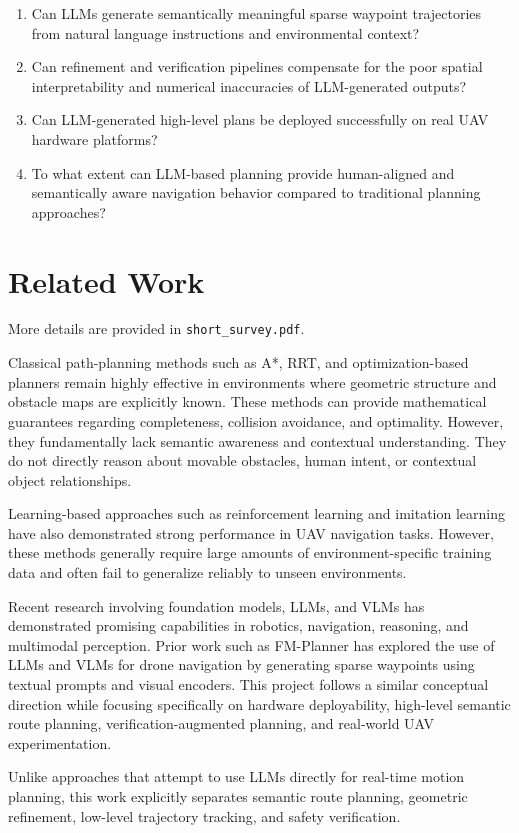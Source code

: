 \documentclass[11pt]{article}
\begin{document}
\begin{enumerate}
  \item Can LLMs generate semantically meaningful sparse waypoint trajectories from natural language instructions and environmental context?
  \item Can refinement and verification pipelines compensate for the poor spatial interpretability and numerical inaccuracies of LLM-generated outputs?
  \item Can LLM-generated high-level plans be deployed successfully on real UAV hardware platforms?
  \item To what extent can LLM-based planning provide human-aligned and semantically aware navigation behavior compared to traditional planning approaches?
\end{enumerate}

\section{Related Work}
More details are provided in \texttt{short\_survey.pdf}.

Classical path-planning methods such as A*, RRT, and optimization-based planners remain highly effective in environments where geometric structure and obstacle maps are explicitly known. These methods can provide mathematical guarantees regarding completeness, collision avoidance, and optimality. However, they fundamentally lack semantic awareness and contextual understanding. They do not directly reason about movable obstacles, human intent, or contextual object relationships.

Learning-based approaches such as reinforcement learning and imitation learning have also demonstrated strong performance in UAV navigation tasks. However, these methods generally require large amounts of environment-specific training data and often fail to generalize reliably to unseen environments.

Recent research involving foundation models, LLMs, and VLMs has demonstrated promising capabilities in robotics, navigation, reasoning, and multimodal perception. Prior work such as FM-Planner has explored the use of LLMs and VLMs for drone navigation by generating sparse waypoints using textual prompts and visual encoders. This project follows a similar conceptual direction while focusing specifically on hardware deployability, high-level semantic route planning, verification-augmented planning, and real-world UAV experimentation.

Unlike approaches that attempt to use LLMs directly for real-time motion planning, this work explicitly separates semantic route planning, geometric refinement, low-level trajectory tracking, and safety verification.
\end{document}
